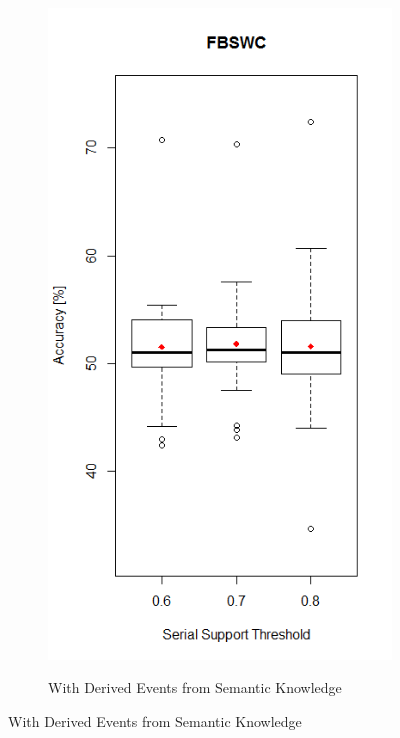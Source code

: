 \begin{figure}
\centering
\begin{subfigure}{.5\textwidth}
  \centering
  \includegraphics[width=\linewidth]{fbswcSupportSerialWithSemantic}
  \label{fig_fbswcSupportSerialWithSemantic}
  \caption{With Derived Events from Semantic Knowledge}
\end{subfigure}%

\end{figure}
